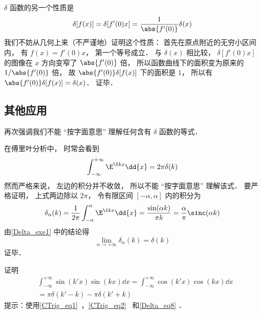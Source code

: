 $\delta$ 函数的另一个性质是
\begin{equation}
\delta[f(x)] = \delta[f'(0)x] = \frac{1}{\abs{f'(0)}} \delta(x)
\end{equation}
我们不妨从几何上来（不严谨地）证明这个性质： 首先在原点附近的无穷小区间内， 有 $f(x) = f'(0)x$， 第一个等号成立． 与 $\delta(x)$ 相比较， $\delta[f'(0)x]$ 的图像在 $x$ 方向变窄了 $\abs{f'(0)}$ 倍， 所以函数曲线下的面积变为原来的 $1/\abs{f'(0)}$ 倍， 故 $\abs{f'(0)}\delta[f(x)]$ 下的面积是 $1$， 所以有 $\abs{f'(0)}\delta[f(x)] = \delta(x)$． 证毕．

\subsection{其他应用}
再次强调我们不能 “按字面意思” 理解任何含有 $\delta$ 函数的等式．
\begin{example}{}\label{Delta_ex1}
在傅里叶分析中， 时常会看到
\begin{equation}\label{Delta_eq8}
\int_{-\infty}^{+\infty} \E^{\I kx}\dd{x} = 2\pi \delta(k)
\end{equation}
然而严格来说， 左边的积分并不收敛， 所以不能 “按字面意思” 理解该式． 要严格证明， 上式两边除以 $2\pi$， 令有限区间 $[-\alpha,\alpha]$ 内的积分为
\begin{equation}
\delta_\alpha(k) = \frac{1}{2\pi}\int_{-\alpha}^{\alpha} \E^{\I kx}\dd{x} = \frac{\sin(\alpha k)}{\pi k} = \frac{\alpha}{\pi} \sinc(\alpha k)
\end{equation}
由\autoref{Delta_exe1} 中的结论得
\begin{equation}
\lim_{\alpha\to+\infty} \delta_\alpha(k) = \delta(k)
\end{equation}
证毕．
\end{example}

\begin{exercise}{}
证明
\begin{equation}\label{Delta_eq9}
\begin{aligned}
&\int_{-\infty}^{+\infty} \sin(k'x) \sin(kx) \dd{x} = \int_{-\infty}^{+\infty} \cos(k'x) \cos(kx) \dd{x}\\
&= \pi\delta(k' - k) - \pi\delta(k' + k)
\end{aligned}
\end{equation}
提示：使用\autoref{CTrig_eq1}~，\autoref{CTrig_eq2}~ 和\autoref{Delta_eq8} ．
\end{exercise}

